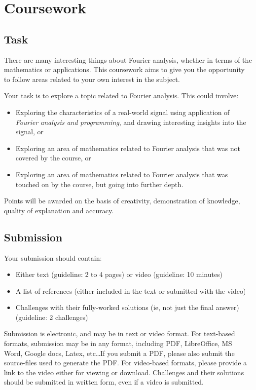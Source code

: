 \newpage
\section{Coursework}
\subsection{Task}
There are many interesting things about Fourier analysis, whether in terms of the mathematics or applications.
This coursework aims to give you the opportunity to follow areas related to your own interest in the subject.

Your task is to explore a topic related to Fourier analysis. This could involve:
\begin{itemize}
    \item Exploring the characteristics of a real-world signal using application of \emph{Fourier analysis and programming}, and drawing interesting insights into the signal, or
    \item Exploring an area of mathematics related to Fourier analysis that was not covered by the course, or
    \item Exploring an area of mathematics related to Fourier analysis that was touched on by the course, but going into further depth.
\end{itemize}


Points will be awarded on the basis of creativity, demonstration of knowledge, quality of explanation and accuracy.

\subsection{Submission}
Your submission should contain:
\begin{itemize}
    \item Either text (guideline: 2 to 4 pages) or video (guideline: 10 minutes)
    \item A list of references (either included in the text or submitted with the video)
    \item Challenges with their fully-worked solutions (ie, not just the final answer) (guideline: 2 challenges)
\end{itemize}

Submission is electronic, and may be in text or video format. For text-based formats, submission may be in any format, including PDF, LibreOffice, MS Word, Google docs, Latex, etc\ldots If you submit a PDF, please also submit the source-files used to generate the PDF. For video-based formats, please provide a link to the video either for viewing or download. Challenges and their solutions should be submitted in written form, even if a video is submitted.

